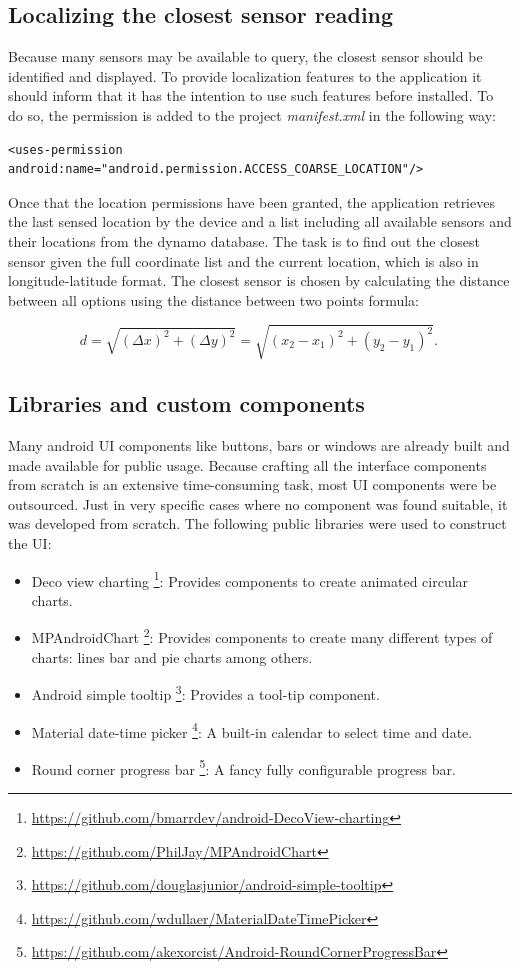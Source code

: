 \subsection{Localizing the closest sensor reading}
Because many sensors may be available to query, the closest sensor should be identified and displayed. To provide localization features to the application it should inform that it has the intention to use such features before installed. To do so, the permission is added to the project \textit{manifest.xml} in the following way: \bigskip

{\centering
\begin{BVerbatim}
<uses-permission android:name="android.permission.ACCESS_COARSE_LOCATION"/>
\end{BVerbatim}
\par
}
\bigskip

Once that the location permissions have been granted, the application retrieves the last sensed location by the device and a list including all available sensors and their locations from the dynamo database. The task is to find out the closest sensor given the full coordinate list and the current location, which is also in longitude-latitude format. The closest sensor is chosen by calculating the distance between all options using the distance between two points formula: 

\begin{equation}
d={\sqrt {(\Delta x)^{2}+(\Delta y)^{2}}}={\sqrt {(x_{2}-x_{1})^{2}+(y_{2}-y_{1})^{2}}}.\,
\end{equation}

\subsection{Libraries and custom components}
Many android UI components like buttons, bars or windows are already built and made available for public usage. Because crafting all the interface components from scratch is an extensive time-consuming task, most UI components were be outsourced. Just in very specific cases where no component was found suitable, it was developed from scratch. 
The following public libraries were used to construct the UI:
\begin{itemize}
    \item Deco view charting \footnote{\url{https://github.com/bmarrdev/android-DecoView-charting}}: Provides components to create animated circular charts.
    \item MPAndroidChart \footnote{\url{https://github.com/PhilJay/MPAndroidChart}}: Provides components to create many different types of charts: lines bar and pie charts among others.
    \item Android simple tooltip \footnote{\url{https://github.com/douglasjunior/android-simple-tooltip}}: Provides a tool-tip component.
	\item Material date-time picker \footnote{\url{https://github.com/wdullaer/MaterialDateTimePicker}}: A built-in calendar to select time and date.
  \item Round corner progress bar \footnote{\url{https://github.com/akexorcist/Android-RoundCornerProgressBar}}: A fancy fully configurable progress bar.
\end{itemize}

